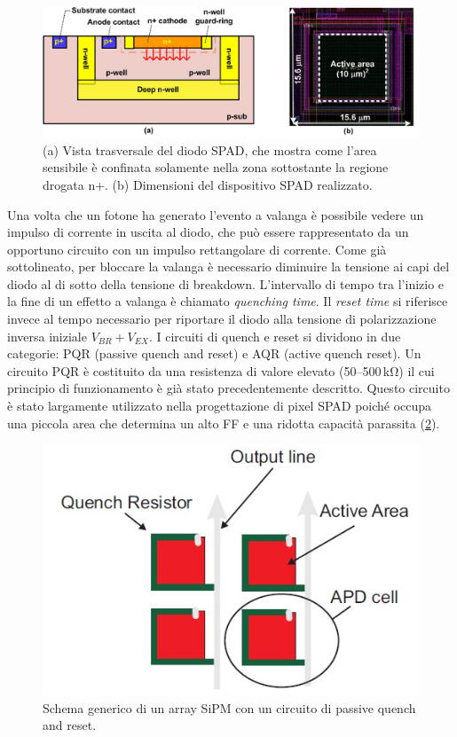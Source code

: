 \begin{figure}[b]
	\centering
	\includegraphics[width=0.8\linewidth]{./ImageFiles/cmos_2.jpg}
	\caption{(a) Vista trasversale del diodo SPAD, che mostra come l'area sensibile è confinata solamente nella zona sottostante la regione drogata n+. (b) Dimensioni del dispositivo SPAD realizzato\cite{Palubiak2011}.} 
	\label{fig:cmos_2}
\end{figure} 

Una volta che un fotone ha generato l'evento a valanga è possibile vedere un impulso di corrente in uscita al diodo, che può essere rappresentato da un opportuno circuito con un impulso rettangolare di corrente. Come già sottolineato, per bloccare la valanga è necessario diminuire la tensione ai capi del diodo al di sotto della tensione di breakdown. L'intervallo di tempo tra l'inizio e la fine di un effetto a valanga è chiamato \textit{quenching time}. Il \textit{reset time} si riferisce invece al tempo necessario per riportare il diodo alla tensione di polarizzazione inversa iniziale $V_{BR}+V_{EX}$. I circuiti di quench e reset si dividono in due categorie: PQR (passive quench and reset) e AQR (active quench reset). Un circuito PQR è costituito da una resistenza di valore elevato (\numrange[range-phrase=--]{50}{500}\,\unit{\kilo\ohm}) il cui principio di funzionamento è già stato precedentemente descritto. Questo circuito è stato largamente utilizzato nella progettazione di pixel SPAD poiché occupa una piccola area che determina un alto FF e una ridotta capacità parassita (\Fig\ref{fig:pqr_array}). 
\begin{figure}[t]
	\centering
	\includegraphics[width=0.6\linewidth]{./ImageFiles/pqr_pixels.jpg}
	\caption{Schema generico di un array SiPM con un circuito di passive quench and reset\cite{Spanoudaki2010}.}
	\label{fig:pqr_array}
\end{figure} 
